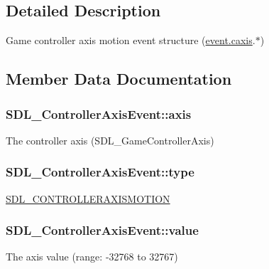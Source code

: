\subsection{Detailed Description}
Game controller axis motion event structure (\hyperlink{union_s_d_l___event_aa8f6df0f2716fae56204b12ab4a4c289}{event.\+caxis}.$\ast$) 

\subsection{Member Data Documentation}
\hypertarget{struct_s_d_l___controller_axis_event_aba6543c143521aebce06a41a8cf79db0}{}
\subsubsection[{axis}]{ S\+D\+L\+\_\+\+Controller\+Axis\+Event\+::axis}\label{struct_s_d_l___controller_axis_event_aba6543c143521aebce06a41a8cf79db0}
The controller axis (S\+D\+L\+\_\+\+Game\+Controller\+Axis) \hypertarget{struct_s_d_l___controller_axis_event_aa904b61e4763d28d887cf8afcc3cbb7c}{}
\subsubsection[{type}]{ S\+D\+L\+\_\+\+Controller\+Axis\+Event\+::type}\label{struct_s_d_l___controller_axis_event_aa904b61e4763d28d887cf8afcc3cbb7c}
\hyperlink{_s_d_l__events_8h_a3b589e89be6b35c02e0dd34a55f3fccaaca6330126f4126f6a45454fa046c25f3}{S\+D\+L\+\_\+\+C\+O\+N\+T\+R\+O\+L\+L\+E\+R\+A\+X\+I\+S\+M\+O\+T\+I\+O\+N} \hypertarget{struct_s_d_l___controller_axis_event_a1ed7f14255ed01b982d40a38791d475a}{}
\subsubsection[{value}]{ S\+D\+L\+\_\+\+Controller\+Axis\+Event\+::value}\label{struct_s_d_l___controller_axis_event_a1ed7f14255ed01b982d40a38791d475a}
The axis value (range\+: -\/32768 to 32767) \hypertarget{struct_s_d_l___controller_axis_event_a07087f68ea9d64b50047d65312ee7b94}{}
